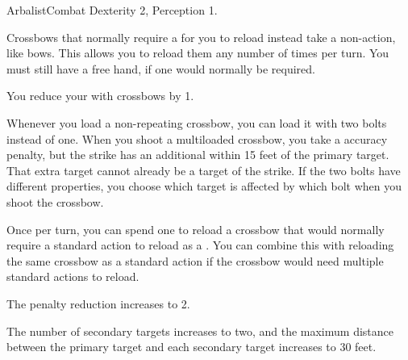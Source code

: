   \begin{feat}{Arbalist}{Combat}
    \featpre Dexterity 2, Perception 1.

     Crossbows that normally require a  for you to reload instead take a non-action, like bows.
    This allows you to reload them any number of times per turn.
    You must still have a free hand, if one would normally be required.

     You reduce your  with crossbows by 1.

     Whenever you load a non-repeating crossbow, you can load it with two bolts instead of one.
    When you shoot a multiloaded crossbow, you take a  accuracy penalty, but the strike has an additional  within 15 feet of the primary target.
    That extra target cannot already be a target of the strike.
    If the two bolts have different properties, you choose which target is affected by which bolt when you shoot the crossbow.

     Once per turn, you can spend one  to reload a crossbow that would normally require a standard action to reload as a .
    You can combine this with reloading the same crossbow as a standard action if the crossbow would need multiple standard actions to reload.

     The penalty reduction increases to 2.

     The number of secondary targets increases to two, and the maximum distance between the primary target and each secondary target increases to 30 feet.
  \end{feat}

